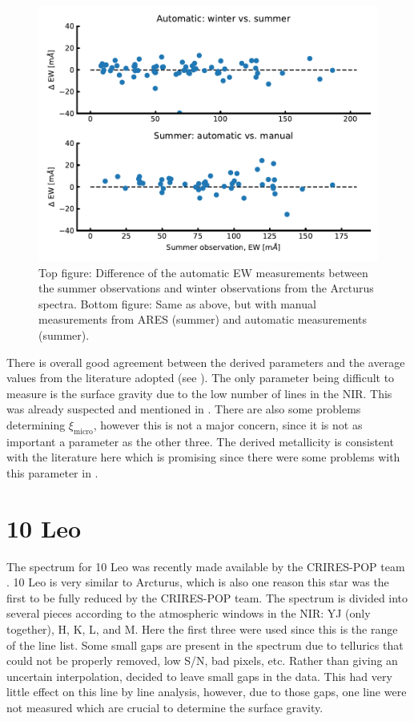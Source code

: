 \begin{figure}[htpb!]
    \centering
    \includegraphics[width=1.0\linewidth]{figures/EWcomp.pdf}
    \caption{Top figure: Difference of the automatic EW measurements between the
             summer observations and winter observations from the Arcturus
             spectra. Bottom figure: Same as above, but with manual measurements
             from ARES (summer) and automatic measurements (summer).}
    \label{fig:EWcomp}
\end{figure}

There is overall good agreement between the derived parameters and the average values from the
literature adopted (see ). The only parameter being difficult to measure is the
surface gravity due to the low number of  lines in the NIR. This was already suspected
and mentioned in . There are also some problems determining
$\xi_\mathrm{micro}$, however this is not a major concern, since it is not as important a parameter
as the other three. The derived metallicity is consistent with the literature here which is
promising since there were some problems with this parameter in .


\section{10 Leo}
\label{sec:10Leo}

The spectrum for 10 Leo was recently made available by the CRIRES-POP team \citep{Nicholls2017}. 10
Leo is very similar to Arcturus, which is also one reason this star was the first to be fully
reduced by the CRIRES-POP team. The spectrum is divided into several pieces according to the
atmospheric windows in the NIR: YJ (only together), H, K, L, and M. Here the first three were used
since this is the range of the line list. Some small gaps are present in the spectrum due to
tellurics that could not be properly removed, low S/N, bad pixels, etc. Rather than giving an
uncertain interpolation, \citet{Nicholls2017} decided to leave small gaps in the data. This had very
little effect on this line by line analysis, however, due to those gaps, one  line were
not measured which are crucial to determine the surface gravity.

